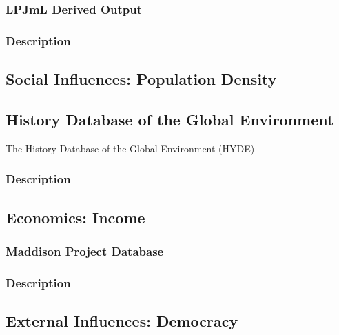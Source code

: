 \documentclass[12pt,twoside]{reedthesis}
\begin{document}
\hypertarget{distdata}{%
\subsubsection{LPJmL Derived Output}\label{distdata}}

\hypertarget{distdesc}{%
\subsubsection{Description}\label{distdesc}}

\hypertarget{popdens}{%
\subsection{Social Influences: Population Density}\label{popdens}}

\hypertarget{HYDE}{%
\subsection{History Database of the Global Environment}\label{HYDE}}

The History Database of the Global Environment (HYDE)

\hypertarget{popdensdesc}{%
\subsubsection{Description}\label{popdensdesc}}

\hypertarget{gdppc}{%
\subsection{Economics: Income}\label{gdppc}}

\hypertarget{maddison}{%
\subsubsection{Maddison Project Database}\label{maddison}}

\hypertarget{gdppcdesc}{%
\subsubsection{Description}\label{gdppcdesc}}

\hypertarget{democracy}{%
\subsection{External Influences: Democracy}\label{democracy}}
\end{document}
